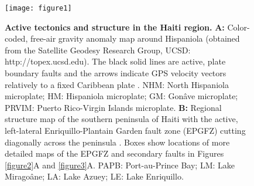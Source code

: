 \documentclass{nature}
\begin{document}
%
%
\clearpage
\begin{figure}
\centering
\texttt{[image: figure1]}
\caption{\textbf{Active tectonics and structure in the Haiti region.} \textbf{A:}
Color-coded, free-air gravity anomaly map around Hispaniola (obtained from the Satellite Geodesy Research Group, UCSD: http://topex.ucsd.edu). The black solid lines are active, plate boundary faults and the arrows indicate GPS velocity vectors relatively to a fixed Caribbean plate \citep{calais2010transpressional}. NHM: North Hispaniola microplate; HM: Hispaniola microplate; GM: Gon\^ave microplate; PRVIM: Puerto Rico-Virgin Islands microplate. \textbf{B:} Regional structure map of the southern peninsula of Haiti with the active, left-lateral Enriquillo-Plantain Garden fault zone (EPGFZ) cutting diagonally across the peninsula \citep{mann1984subaerially,mann1995actively}. Boxes show locations of more detailed maps of the EPGFZ and secondary faults in Figures \ref{figure2}A and \ref{figure3}A. PAPB: Port-au-Prince Bay; LM: Lake Mirago\^ane; LA: Lake Azuey; LE: Lake Enriquillo.}
\label{figure1}
\end{figure}

\end{document}

